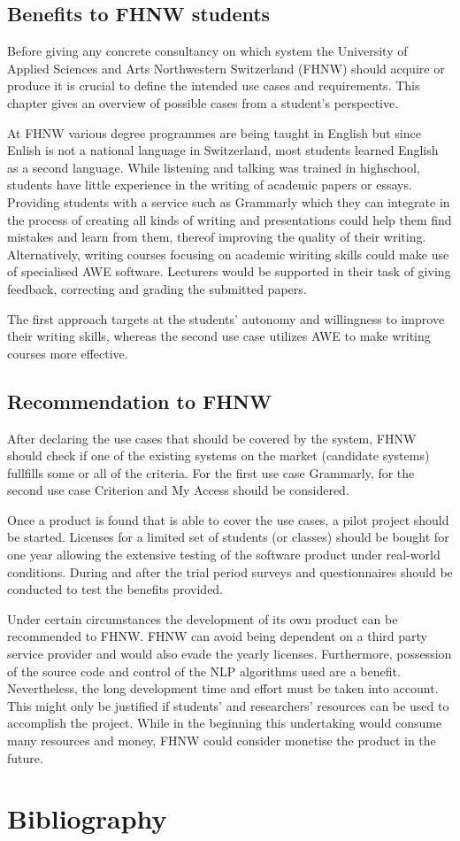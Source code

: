 \documentclass[runningheads]{llncs}
\let\OldTextregistered\textregistered
\renewcommand{\textregistered}{\OldTextregistered\xspace}
\begin{document}
\subsection{Benefits to FHNW students}
Before giving any concrete consultancy on which system the University of Applied Sciences and Arts Northwestern Switzerland (FHNW) should acquire or produce it is crucial to define the intended use cases and requirements. This chapter gives an overview of possible cases from a student's perspective.

At FHNW various degree programmes are being taught in English \citep{noauthor_fhnw_nodate} but since Enlish is not a national language in Switzerland, most students learned English as a second language. While listening and talking was trained in highschool, students have little experience in the writing of academic papers or essays. Providing students with a service such as Grammarly\textregistered which they can integrate in the process of creating all kinds of writing and presentations could help them find mistakes and learn from them, thereof improving the quality of their writing. Alternatively, writing courses focusing on academic wiriting skills could make use of specialised AWE software. Lecturers would be supported in their task of giving feedback, correcting and grading the submitted papers.

The first approach targets at the students' autonomy and willingness to improve their writing skills, whereas the second use case utilizes AWE to make writing courses more effective. 

\subsection{Recommendation to FHNW}
After declaring the use cases that should be covered by the system, FHNW should check if one of the existing systems on the market (candidate systems) fullfills some or all of the criteria. For the first use case Grammarly\textregistered, for the second use case Criterion\textregistered and My Access should be considered. 

Once a product is found that is able to cover the use cases, a pilot project should be started. Licenses for a limited set of students (or classes) should be bought for one year allowing the extensive testing of the software product under real-world conditions. During and after the trial period surveys and questionnaires should be conducted to test the benefits provided. 

Under certain circumstances the development of its own product can be recommended to FHNW. FHNW can avoid being dependent on a third party service provider and would also evade the yearly licenses. Furthermore, possession of the source code and control of the NLP algorithms used are a benefit. Nevertheless, the long development time and effort must be taken into account. This might only be justified if students' and researchers' resources can be used to accomplish the project. While in the beginning this undertaking would consume many resources and money, FHNW could consider monetise the product in the future.

\section{Bibliography}


\printbibliography
\end{document}
